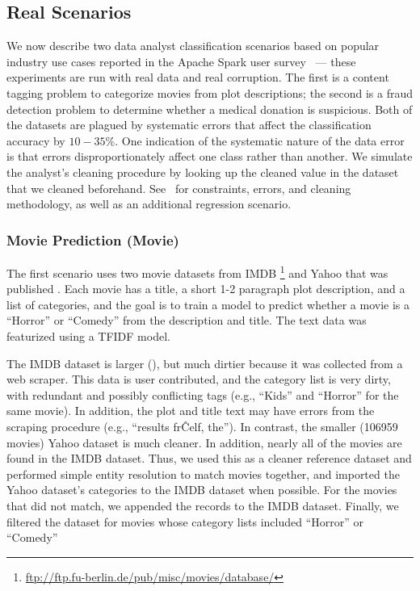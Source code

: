 \subsection{Real Scenarios}\label{real-errors}
We now describe two data analyst classification scenarios based on popular industry use cases reported in the Apache Spark user survey~\cite{sparksurvey} --- these experiments are run with real data and real corruption.
The first is a content tagging problem to categorize movies from plot descriptions; 
the second is a fraud detection problem to  determine whether a medical donation is suspicious.
Both of the datasets are plagued by systematic errors that affect the classification accuracy by $10-35\%$.
One indication of the systematic nature of the data error is that errors disproportionately affect one class rather than another.
We simulate the analyst's cleaning procedure by looking up the cleaned value in the dataset that we cleaned beforehand.
See~\cite{activecleanarxiv} for constraints, errors, and cleaning methodology, as well as an additional regression scenario.

\subsubsection{Movie Prediction (Movie)}
The first scenario uses two movie datasets from IMDB \footnote{\tiny \url{ftp://ftp.fu-berlin.de/pub/misc/movies/database/}} and Yahoo that was published .
Each movie has a title, a short 1-2 paragraph plot description, and a list of categories, and the goal is to train a model to predict whether a movie is a ``Horror'' or ``Comedy'' from the description and title.  The text data was featurized using a TFIDF model.

The IMDB dataset is larger (), but much dirtier because it was collected from a web scraper.  
This data is user contributed, and the category list is very dirty, with redundant and possibly conflicting tags (e.g., ``Kids'' and ``Horror'' for the same movie).  
In addition, the plot and title text may have errors from the scraping procedure (e.g., ``results fr\^Celf, the'').
In contrast, the smaller (106959 movies) Yahoo dataset is much cleaner.  In addition, nearly all of the movies are found in the IMDB dataset.
Thus, we used this as a cleaner reference dataset and performed simple entity resolution to match movies together, and imported the Yahoo dataset's categories to the IMDB dataset when possible.
For the movies that did not match, we appended the records to the IMDB dataset.
Finally, we filtered the dataset for movies whose category lists included ``Horror'' or ``Comedy''


